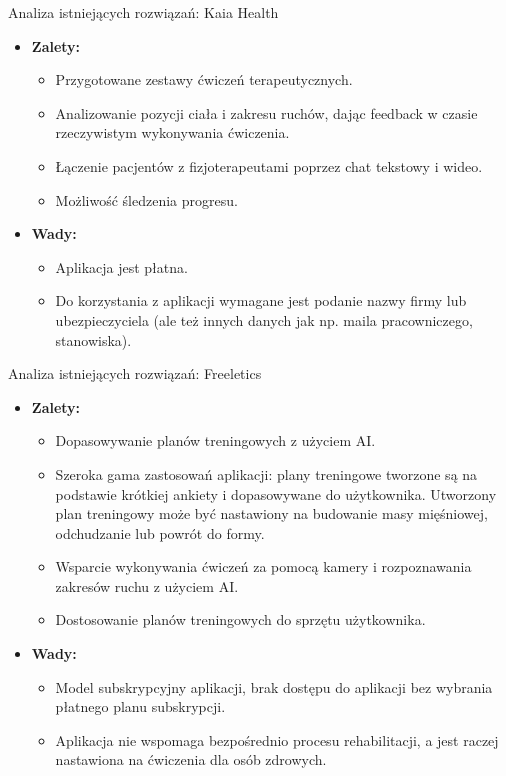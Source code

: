 \documentclass{beamer}
\begin{document}
\begin{frame}{Analiza istniejących rozwiązań: Kaia Health}
    \begin{itemize}
        \item \textbf{Zalety:}
        \begin{itemize}
            \item Przygotowane zestawy ćwiczeń terapeutycznych.
            \item Analizowanie pozycji ciała i zakresu ruchów, dając feedback w czasie rzeczywistym wykonywania ćwiczenia.
            \item Łączenie pacjentów z fizjoterapeutami poprzez chat tekstowy i wideo.
            \item Możliwość śledzenia progresu.
        \end{itemize}
        \item \textbf{Wady:}
        \begin{itemize}
            \item Aplikacja jest płatna.
            \item Do korzystania z aplikacji wymagane jest podanie nazwy firmy lub ubezpieczyciela (ale też innych danych jak np. maila pracowniczego, stanowiska).
        \end{itemize}
    \end{itemize}
\end{frame}

\begin{frame}{Analiza istniejących rozwiązań: Freeletics}
    \begin{itemize}
        \item \textbf{Zalety:}
        \begin{itemize}
            \item Dopasowywanie planów treningowych z użyciem AI.
            \item Szeroka gama zastosowań aplikacji: plany treningowe tworzone są na podstawie krótkiej ankiety i dopasowywane do użytkownika. Utworzony plan treningowy może być nastawiony na budowanie masy mięśniowej, odchudzanie lub powrót do formy.
            \item Wsparcie wykonywania ćwiczeń za pomocą kamery i rozpoznawania zakresów ruchu z użyciem AI.
            \item Dostosowanie planów treningowych do sprzętu użytkownika.
        \end{itemize}
        \item \textbf{Wady:}
        \begin{itemize}
            \item Model subskrypcyjny aplikacji, brak dostępu do aplikacji bez wybrania płatnego planu subskrypcji.
            \item Aplikacja nie wspomaga bezpośrednio procesu rehabilitacji, a jest raczej nastawiona na ćwiczenia dla osób zdrowych.
        \end{itemize}
    \end{itemize}
\end{frame}
\end{document}
